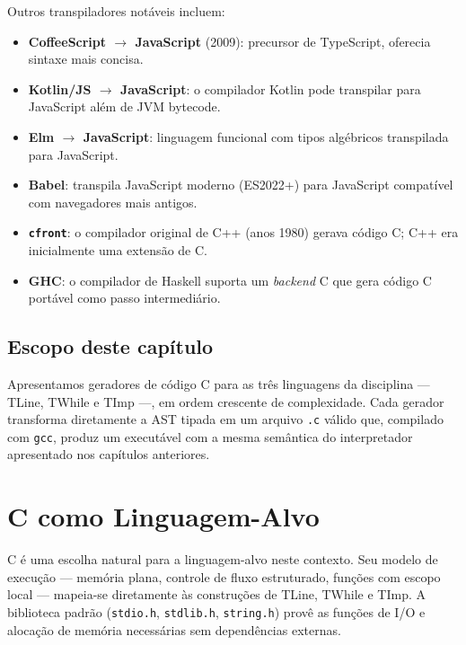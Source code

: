 Outros transpiladores notáveis incluem:
\begin{itemize}
  \item \textbf{CoffeeScript $\to$ JavaScript} (2009): precursor de TypeScript,
    oferecia sintaxe mais concisa.
  \item \textbf{Kotlin/JS $\to$ JavaScript}: o compilador Kotlin pode
    transpilar para JavaScript além de JVM bytecode.
  \item \textbf{Elm $\to$ JavaScript}: linguagem funcional com tipos algébricos
    transpilada para JavaScript.
  \item \textbf{Babel}: transpila JavaScript moderno (ES2022+) para JavaScript
    compatível com navegadores mais antigos.
  \item \textbf{\texttt{cfront}}: o compilador original de C++ (anos 1980)
    gerava código C; C++ era inicialmente uma extensão de C.
  \item \textbf{GHC}: o compilador de Haskell suporta um \emph{backend} C
    que gera código C portável como passo intermediário.
\end{itemize}

\subsection{Escopo deste capítulo}

Apresentamos geradores de código C para as três linguagens da disciplina —
TLine, TWhile e TImp —, em ordem crescente de complexidade.  Cada gerador
transforma diretamente a AST tipada em um arquivo \texttt{.c} válido que,
compilado com \texttt{gcc}, produz um executável com a mesma semântica do
interpretador apresentado nos capítulos anteriores.

\section{C como Linguagem-Alvo}\label{sec:c-target}

C é uma escolha natural para a linguagem-alvo neste contexto.  Seu modelo de
execução — memória plana, controle de fluxo estruturado, funções com escopo
local — mapeia-se diretamente às construções de TLine, TWhile e TImp.  A
biblioteca padrão (\texttt{stdio.h}, \texttt{stdlib.h}, \texttt{string.h})
provê as funções de I/O e alocação de memória necessárias sem dependências
externas.

